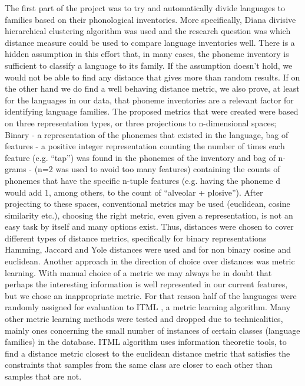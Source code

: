 \documentclass[letterpaper, 11pt]{article}
\begin{document}
The first part of the project was to try and automatically divide languages to families based on their phonological inventories. More specifically, Diana \cite{patnaik2016divisive} divisive hierarchical clustering algorithm was used and the research question was which distance measure could be used to compare language inventories well. There is a hidden assumption in this effort that, in many cases, the phoneme inventory is sufficient to classify a language to its family. If the assumption doesn't hold, we would not be able to find any distance that gives more than random results. If on the other hand we do find a well behaving distance metric, we also prove, at least for the languages in our data, that phoneme inventories are a relevant factor  for identifying language families. The proposed metrics that were created were based on three representation types, or three projections to n-dimensional spaces; Binary - a representation of the phonemes that existed in the language, bag of features - a positive integer representation counting the number of times each feature (e.g. “tap”) was found in the phonemes of the inventory and bag of n-grams - (n=2 was used to avoid too many features) containing the counts of phonemes that have the specific n-tuple features (e.g. having the phoneme d would add 1, among others, to the count of “alveolar + plosive”). After projecting to these spaces, conventional metrics may be used (euclidean, cosine similarity etc.), choosing the right metric, even given a representation, is not an easy task by itself and many options exist. Thus, distances were chosen to cover different types of distance metrics\cite{cha2007comprehensive,choi2010survey}, specifically for binary representations Hamming, Jaccard and Yole distances were used and for non binary cosine and euclidean.
Another approach in the direction of choice over distances was metric learning. With manual choice of a metric we may always be in doubt that perhaps the interesting information is well represented in our current features, but we chose an inappropriate metric. For that reason half of the languages were randomly assigned for evaluation to ITML \cite{davis2007information}, a metric learning algorithm. Many other metric learning methods \cite{shental2002adjustment} were tested and dropped due to technicalities, mainly ones concerning the small number of instances of certain classes (language families) in the database. ITML algorithm uses information theoretic tools,  to find a distance metric closest to the euclidean distance metric that satisfies the constraints that samples from the same class are closer to each other than samples that are not.
\end{document}
